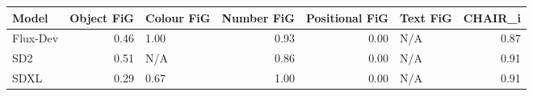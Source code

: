\begin{tabular}{lrlrrlr}
\toprule
Model & Object FiG & Colour FiG & Number FiG & Positional FiG & Text FiG & CHAIR_i \\
\midrule
Flux-Dev & 0.46 & 1.00 & 0.93 & 0.00 & N/A & 0.87 \\
SD2 & 0.51 & N/A & 0.86 & 0.00 & N/A & 0.91 \\
SDXL & 0.29 & 0.67 & 1.00 & 0.00 & N/A & 0.91 \\
\bottomrule
\end{tabular}
